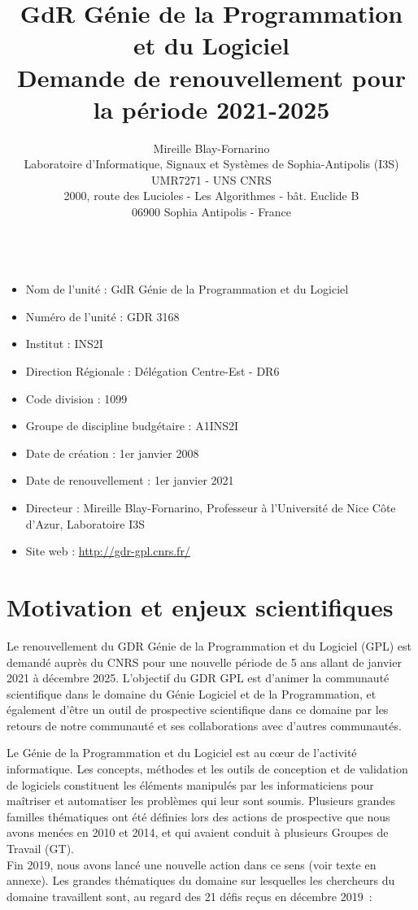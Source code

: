 \documentclass[11pt]{article}
\title{GdR Génie de la Programmation et du Logiciel\\ Demande de renouvellement pour la période 2021-2025}
\author{Mireille Blay-Fornarino\\
Laboratoire d'Informatique, Signaux et Systèmes de Sophia-Antipolis (I3S)\\ 
UMR7271 - UNS CNRS\\
2000, route des Lucioles - Les Algorithmes - bât. Euclide B\\
06900 Sophia Antipolis - France\\
\\
}
\begin{document}
\maketitle



\begin{itemize}
\item Nom de l'unité : GdR Génie de la Programmation et du Logiciel
\item Numéro de l'unité : GDR 3168
\item Institut : INS2I
\item Direction Régionale : Délégation Centre-Est - DR6
\item Code division : 1099
\item Groupe de discipline budgétaire : A1INS2I
\item Date de création : 1er janvier 2008
\item Date de renouvellement : 1er janvier 2021
\item Directeur : Mireille Blay-Fornarino, Professeur à l'Université de Nice Côte d'Azur, Laboratoire I3S
\item Site web : \url{http://gdr-gpl.cnrs.fr/}
\end{itemize}

\section{Motivation et enjeux scientifiques}

Le renouvellement du GDR Génie de la Programmation et du Logiciel (GPL) est
demandé auprès du CNRS pour une nouvelle période de 5 ans allant de janvier
2021 à décembre 2025.
L'objectif du GDR GPL est d'animer la communauté scientifique dans
le domaine du Génie Logiciel et de la Programmation, et également d'être un outil de prospective scientifique dans ce domaine par les retours de notre communauté et ses collaborations avec d'autres communautés.






Le Génie de la Programmation et du Logiciel est au c{\oe}ur de l'activité
informatique. Les concepts, méthodes et les outils de conception et de
validation de logiciels constituent les éléments manipulés par les
informaticiens pour maîtriser et automatiser les problèmes qui leur sont
soumis. 
Plusieurs grandes familles thématiques ont été définies lors des actions de prospective que nous avons menées en 2010 et 2014, et qui avaient conduit à plusieurs Groupes de Travail (GT). \\
Fin 2019, nous avons lancé une nouvelle action dans ce sens (voir texte en annexe). %
Les grandes thématiques du domaine sur lesquelles les chercheurs du
domaine travaillent sont, au regard des 21 défis reçus en décembre 2019~: 
\end{document}
